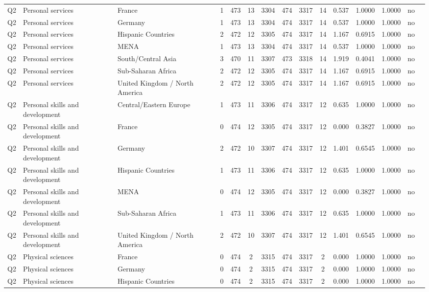 \begin{longtable}{lllrcccccccccll}
Q2 & Personal services & France & 1 & 473 & 13 & 3304 & 474 & 3317 & 14 & 0.537 & 1.0000 & 1.0000 & no \\
Q2 & Personal services & Germany & 1 & 473 & 13 & 3304 & 474 & 3317 & 14 & 0.537 & 1.0000 & 1.0000 & no \\
Q2 & Personal services & Hispanic Countries & 2 & 472 & 12 & 3305 & 474 & 3317 & 14 & 1.167 & 0.6915 & 1.0000 & no \\
Q2 & Personal services & MENA & 1 & 473 & 13 & 3304 & 474 & 3317 & 14 & 0.537 & 1.0000 & 1.0000 & no \\
Q2 & Personal services & South/Central Asia & 3 & 470 & 11 & 3307 & 473 & 3318 & 14 & 1.919 & 0.4041 & 1.0000 & no \\
Q2 & Personal services & Sub-Saharan Africa & 2 & 472 & 12 & 3305 & 474 & 3317 & 14 & 1.167 & 0.6915 & 1.0000 & no \\
Q2 & Personal services & United Kingdom / North America & 2 & 472 & 12 & 3305 & 474 & 3317 & 14 & 1.167 & 0.6915 & 1.0000 & no \\
Q2 & Personal skills and development & Central/Eastern Europe & 1 & 473 & 11 & 3306 & 474 & 3317 & 12 & 0.635 & 1.0000 & 1.0000 & no \\
Q2 & Personal skills and development & France & 0 & 474 & 12 & 3305 & 474 & 3317 & 12 & 0.000 & 0.3827 & 1.0000 & no \\
Q2 & Personal skills and development & Germany & 2 & 472 & 10 & 3307 & 474 & 3317 & 12 & 1.401 & 0.6545 & 1.0000 & no \\
Q2 & Personal skills and development & Hispanic Countries & 1 & 473 & 11 & 3306 & 474 & 3317 & 12 & 0.635 & 1.0000 & 1.0000 & no \\
Q2 & Personal skills and development & MENA & 0 & 474 & 12 & 3305 & 474 & 3317 & 12 & 0.000 & 0.3827 & 1.0000 & no \\
Q2 & Personal skills and development & Sub-Saharan Africa & 1 & 473 & 11 & 3306 & 474 & 3317 & 12 & 0.635 & 1.0000 & 1.0000 & no \\
Q2 & Personal skills and development & United Kingdom / North America & 2 & 472 & 10 & 3307 & 474 & 3317 & 12 & 1.401 & 0.6545 & 1.0000 & no \\
Q2 & Physical sciences & France & 0 & 474 & 2 & 3315 & 474 & 3317 & 2 & 0.000 & 1.0000 & 1.0000 & no \\
Q2 & Physical sciences & Germany & 0 & 474 & 2 & 3315 & 474 & 3317 & 2 & 0.000 & 1.0000 & 1.0000 & no \\
Q2 & Physical sciences & Hispanic Countries & 0 & 474 & 2 & 3315 & 474 & 3317 & 2 & 0.000 & 1.0000 & 1.0000 & no \\

\end{longtable}
